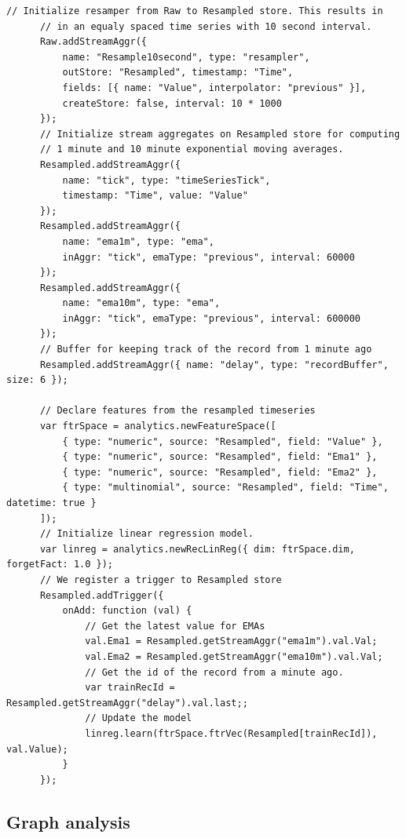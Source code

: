 \documentclass{article} %
\begin{document}
      \begin{lstlisting}[caption=Time series processing] 	
      // Initialize resamper from Raw to Resampled store. This results in
      // in an equaly spaced time series with 10 second interval.
      Raw.addStreamAggr({
          name: "Resample10second", type: "resampler",
          outStore: "Resampled", timestamp: "Time",
          fields: [{ name: "Value", interpolator: "previous" }],
          createStore: false, interval: 10 * 1000
      });
      // Initialize stream aggregates on Resampled store for computing
      // 1 minute and 10 minute exponential moving averages.
      Resampled.addStreamAggr({
          name: "tick", type: "timeSeriesTick",
          timestamp: "Time", value: "Value"
      });
      Resampled.addStreamAggr({
          name: "ema1m", type: "ema",
          inAggr: "tick", emaType: "previous", interval: 60000
      });
      Resampled.addStreamAggr({
          name: "ema10m", type: "ema",
          inAggr: "tick", emaType: "previous", interval: 600000
      });
      // Buffer for keeping track of the record from 1 minute ago
      Resampled.addStreamAggr({ name: "delay", type: "recordBuffer", size: 6 });

      // Declare features from the resampled timeseries
      var ftrSpace = analytics.newFeatureSpace([
          { type: "numeric", source: "Resampled", field: "Value" },
          { type: "numeric", source: "Resampled", field: "Ema1" },
          { type: "numeric", source: "Resampled", field: "Ema2" },
          { type: "multinomial", source: "Resampled", field: "Time", datetime: true }
      ]);
      // Initialize linear regression model.
      var linreg = analytics.newRecLinReg({ dim: ftrSpace.dim, forgetFact: 1.0 });
      // We register a trigger to Resampled store
      Resampled.addTrigger({
          onAdd: function (val) {
              // Get the latest value for EMAs
              val.Ema1 = Resampled.getStreamAggr("ema1m").val.Val;
              val.Ema2 = Resampled.getStreamAggr("ema10m").val.Val;
              // Get the id of the record from a minute ago.
              var trainRecId = Resampled.getStreamAggr("delay").val.last;;
              // Update the model
              linreg.learn(ftrSpace.ftrVec(Resampled[trainRecId]), val.Value);
          }
      });
      \end{lstlisting}


\subsection{Graph analysis}
\end{document}

